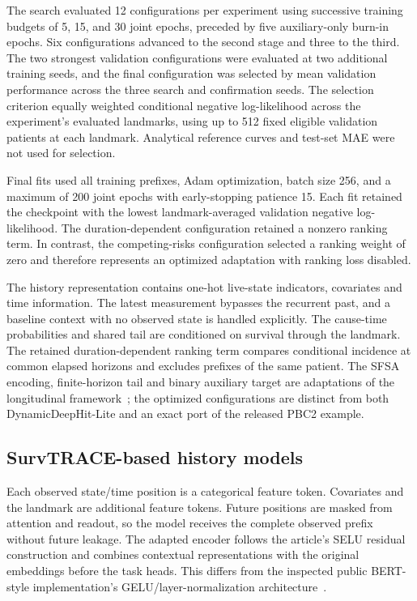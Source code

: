 The search evaluated 12 configurations per experiment using successive training budgets of 5, 15, and 30 joint epochs, preceded by five auxiliary-only burn-in epochs. Six configurations advanced to the second stage and three to the third. The two strongest validation configurations were evaluated at two additional training seeds, and the final configuration was selected by mean validation performance across the three search and confirmation seeds. The selection criterion equally weighted conditional negative log-likelihood across the experiment's evaluated landmarks, using up to 512 fixed eligible validation patients at each landmark. Analytical reference curves and test-set MAE were not used for selection.

Final fits used all training prefixes, Adam optimization, batch size 256, and a maximum of 200 joint epochs with early-stopping patience 15. Each fit retained the checkpoint with the lowest landmark-averaged validation negative log-likelihood. The duration-dependent configuration retained a nonzero ranking term. In contrast, the competing-risks configuration selected a ranking weight of zero and therefore represents an optimized adaptation with ranking loss disabled.

The history representation contains one-hot live-state indicators, covariates and time information. The latest measurement bypasses the recurrent past, and a baseline context with no observed state is handled explicitly. The cause-time probabilities and shared tail are conditioned on survival through the landmark. The retained duration-dependent ranking term compares conditional incidence at common elapsed horizons and excludes prefixes of the same patient. The SFSA encoding, finite-horizon tail and binary auxiliary target are adaptations of the longitudinal framework~\citep{lee2019dynamic}; the optimized configurations are distinct from both DynamicDeepHit-Lite and an exact port of the released PBC2 example.

\subsection{SurvTRACE-based history models}
Each observed state/time position is a categorical feature token. Covariates and the landmark are additional feature tokens. Future positions are masked from attention and readout, so the model receives the complete observed prefix without future leakage. The adapted encoder follows the article's SELU residual construction and combines contextual representations with the original embeddings before the task heads. This differs from the inspected public BERT-style implementation's GELU/layer-normalization architecture~\citep{wang2022survtrace}.

